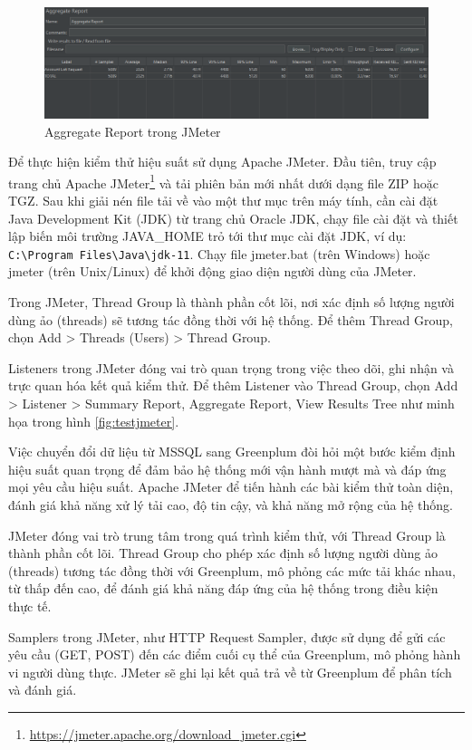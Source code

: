 \documentclass[14pt]{article}
\begin{document}
\begin{figure}
    \centering
    \includegraphics[width=0.8\linewidth]{images/ar.png}
    \caption{Aggregate Report trong JMeter}
    \label{fig:ar}
\end{figure}




Để thực hiện kiểm thử hiệu suất sử dụng Apache JMeter. Đầu tiên, truy cập trang chủ Apache JMeter\footnote{\url{https://jmeter.apache.org/download_jmeter.cgi}} và tải phiên bản mới nhất dưới dạng file ZIP hoặc TGZ. Sau khi giải nén file tải về vào một thư mục trên máy tính, cần cài đặt Java Development Kit (JDK) từ trang chủ Oracle JDK, chạy file cài đặt và thiết lập biến môi trường JAVA\_HOME trỏ tới thư mục cài đặt JDK, ví dụ: \verb|C:\Program Files\Java\jdk-11|. Chạy file jmeter.bat (trên Windows) hoặc jmeter (trên Unix/Linux) để khởi động giao diện người dùng của JMeter.


Trong JMeter, Thread Group là thành phần cốt lõi, nơi xác định số lượng người dùng ảo (threads) sẽ tương tác đồng thời với hệ thống. Để thêm Thread Group, chọn Add > Threads (Users) > Thread Group.

Listeners trong JMeter đóng vai trò quan trọng trong việc theo dõi, ghi nhận và trực quan hóa kết quả kiểm thử. Để thêm Listener vào Thread Group, chọn Add > Listener > Summary Report, Aggregate Report, View Results Tree như minh họa trong hình \ref{fig:testjmeter}.

Việc chuyển đổi dữ liệu từ MSSQL sang Greenplum đòi hỏi một bước kiểm định hiệu suất quan trọng để đảm bảo hệ thống mới vận hành mượt mà và đáp ứng mọi yêu cầu hiệu suất. Apache JMeter để tiến hành các bài kiểm thử toàn diện, đánh giá khả năng xử lý tải cao, độ tin cậy, và khả năng mở rộng của hệ thống.

JMeter đóng vai trò trung tâm trong quá trình kiểm thử, với Thread Group là thành phần cốt lõi. Thread Group cho phép xác định số lượng người dùng ảo (threads) tương tác đồng thời với Greenplum, mô phỏng các mức tải khác nhau, từ thấp đến cao, để đánh giá khả năng đáp ứng của hệ thống trong điều kiện thực tế.

Samplers trong JMeter, như HTTP Request Sampler, được sử dụng để gửi các yêu cầu (GET, POST) đến các điểm cuối cụ thể của Greenplum, mô phỏng hành vi người dùng thực. JMeter sẽ ghi lại kết quả trả về từ Greenplum để phân tích và đánh giá.
\end{document}
